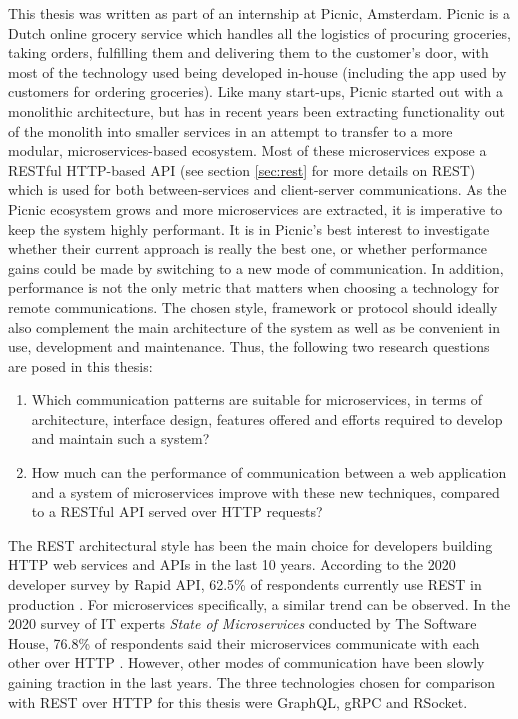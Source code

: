 This thesis was written as part of an internship at Picnic, Amsterdam. Picnic is a Dutch online grocery service which handles all the logistics of procuring groceries, taking orders, fulfilling them and delivering them to the customer's door, with most of the technology used being developed in-house (including the app used by customers for ordering groceries). Like many start-ups, Picnic started out with a monolithic architecture, but has in recent years been extracting functionality out of the monolith into smaller services in an attempt to transfer to a more modular, microservices-based ecosystem. Most of these microservices expose a RESTful HTTP-based API (see section \ref{sec:rest} for more details on REST) which is used for both between-services and client-server communications. As the Picnic ecosystem grows and more microservices are extracted, it is imperative to keep the system highly performant. It is in Picnic's best interest to investigate whether their current approach is really the best one, or whether performance gains could be made by switching to a new mode of communication. In addition, performance is not the only metric that matters when choosing a technology for remote communications. The chosen style, framework or protocol should ideally also complement the main architecture of the system as well as be convenient in use, development and maintenance. Thus, the following two research questions are posed in this thesis:

\begin{enumerate}
    \item Which communication patterns are suitable for microservices, in terms of architecture, interface design, features offered and efforts required to develop and maintain such a system?
    \item How much can the performance of communication between a web application and a system of microservices improve with these new techniques, compared to a RESTful API served over HTTP requests?
\end{enumerate}

The REST architectural style has been the main choice for developers building HTTP web services and APIs in the last 10 years. According to the 2020 developer survey by Rapid API, 62.5\% of respondents currently use REST in production \cite{rapid2020survey}. For microservices specifically, a similar trend can be observed. In the 2020 survey of IT experts \textit{State of Microservices} conducted by The Software House, 76.8\% of respondents said their microservices communicate with each other over HTTP \cite{stateofmicroservices}. However, other modes of communication have been slowly gaining traction in the last years. The three technologies chosen for comparison with REST over HTTP for this thesis were GraphQL, gRPC and RSocket.

